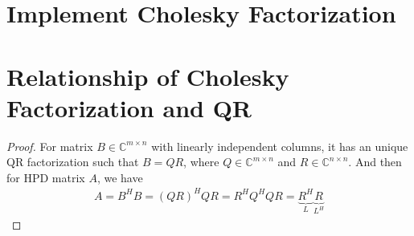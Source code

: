 \documentclass[11pt,a4paper]{article}
\begin{document}
\section{Implement Cholesky Factorization}


%

\setcounter{section}{14}
\section{Relationship of Cholesky Factorization and QR}
\begin{proof}
    For matrix $B\in\mathbb{C}^{m\times n}$ with  linearly independent columns, it has an unique 
    QR factorization such that $B = QR$, where $Q\in \mathbb{C}^{m\times n}$
    and $R\in \mathbb{C}^{n\times n}$. And then for HPD matrix $A$, we have
    \begin{align}
       A = B^H B = (QR)^H QR = R^H Q^H Q R = \underbrace{R^H}_{L}
        \underbrace{R}_{L^H}
    \end{align}
\end{proof}
\end{document}
